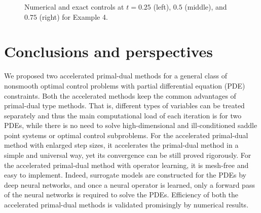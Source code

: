 \documentclass[final]{siamart171218}
\theoremstyle{remark}
\begin{document}
\begin{figure}[htpb]
	\caption{ Numerical and exact controls at $t=0.25$ (left), $0.5$ (middle), and $0.75$ (right)  for Example 4.}\label{fig:result_ol_para}
	\centering
\end{figure}

\section{Conclusions and perspectives}\label{sec:conclusion}

We proposed two accelerated primal-dual methods for a general class of nonsmooth optimal control problems with partial differential equation (PDE) constraints. Both the accelerated methods keep the common advantages of primal-dual type methods. That is, different types of variables can be treated separately and thus the main computational load of each iteration is for two PDEs, while there is no need to solve high-dimensional and ill-conditioned saddle point systems or optimal control subproblems. For the accelerated primal-dual method with enlarged step sizes, it accelerates the primal-dual method in a simple and universal way, yet its convergence can be still proved rigorously. For the accelerated primal-dual method with operator learning, it is mesh-free and easy to implement. Indeed, surrogate models are constructed for the PDEs by deep neural networks, and once a neural operator is learned, only a forward pass of the neural networks is required to solve the PDEs. Efficiency of both the accelerated primal-dual methods is validated promisingly by numerical results.
\end{document}
